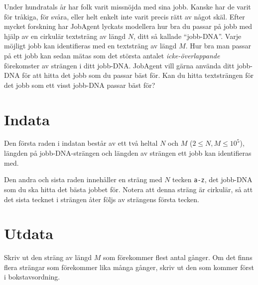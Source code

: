 Under hundratals år har folk varit missnöjda med sina jobb.
Kanske har de varit för tråkiga, för svåra, eller helt enkelt inte varit precis rätt av något skäl.
Efter mycket forskning har JobAgent lyckats modellera hur bra du passar på jobb med hjälp av en cirkulär textsträng av längd $N$, ditt så kallade ``jobb-DNA''.
Varje möjligt jobb kan identifieras med en textsträng av längd $M$.
Hur bra man passar på ett jobb kan sedan mätas som det största antalet \emph{icke-överlappande} förekomster av strängen i ditt jobb-DNA.
JobAgent vill gärna använda ditt jobb-DNA för att hitta det jobb som du passar bäst för.
Kan du hitta textsträngen för det jobb som ett visst jobb-DNA passar bäst för?

\section*{Indata}
Den första raden i indatan består av ett två heltal $N$ och $M$ ($2 \le N, M \le 10^5$), längden på jobb-DNA-strängen och längden av strängen ett jobb kan identifieras med.

Den andra och sista raden innehåller en sträng med $N$ tecken \texttt{a-z}, det jobb-DNA som du ska hitta det bästa jobbet för.
Notera att denna sträng är cirkulär, så att det sista tecknet i strängen åter följs av strängens första tecken.

\section*{Utdata}
Skriv ut den sträng av längd $M$ som förekommer flest antal gånger.
Om det finns flera strängar som förekommer lika många gånger, skriv ut den som kommer först i bokstavsordning.
